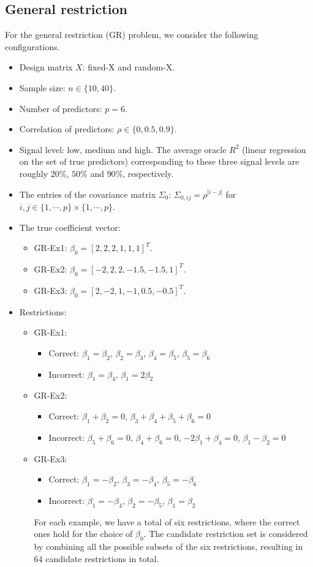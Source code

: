\documentclass{article}
\begin{document}
\subsection{General restriction}
For the general restriction (GR) problem, we consider the following configurations.
\begin{itemize}
  \item Design matrix $X$: fixed-X and random-X.
  \item Sample size: $n \in \{10, 40\}$.
  \item Number of predictors: $p=6$.
  \item Correlation of predictors: $\rho \in \{0,0.5,0.9\}$.
  \item Signal level: low, medium and high. The average oracle $R^2$ (linear regression on the set of true predictors) corresponding to these three signal levels are roughly $20\%$, $50\%$ and $90\%$, respectively.
  \item The entries of the covariance matrix $\Sigma_0$: $\Sigma_{0,ij}=\rho^{|i-j|}$ for $i,j\in\{1,\cdots,p\}\times\{1,\cdots,p\}$.
  \item The true coefficient vector:
  \begin{itemize}
    \item GR-Ex1: $\beta_0 = [2,2,2,1,1,1]^T$. 
    \item GR-Ex2: $\beta_0 = [-2,2,2,-1.5,-1.5,1]^T$.
    \item GR-Ex3: $\beta_0 = [2,-2,1,-1,0.5,-0.5]^T$.
  \end{itemize}
  \item Restrictions:
  \begin{itemize}
    \item GR-Ex1: 
    \begin{itemize}
      \item Correct: $\beta_1=\beta_2$, $\beta_2=\beta_3$, $\beta_4=\beta_5$, $\beta_5=\beta_6$
      \item Incorrect: $\beta_1=\beta_4$, $\beta_1=2\beta_2$
    \end{itemize}
    \item GR-Ex2:
    \begin{itemize}
      \item Correct: $\beta_1+\beta_2=0$, $\beta_3+\beta_4+\beta_5+\beta_6=0$
      \item Incorrect: $\beta_5+\beta_6=0$, $\beta_4+\beta_6=0$, $-2\beta_1+\beta_4=0$, $\beta_1-\beta_2=0$
    \end{itemize}
    \item GR-Ex3: 
    \begin{itemize}
      \item Correct: $\beta_1=-\beta_2$, $\beta_3=-\beta_4$, $\beta_5=-\beta_6$
      \item Incorrect: $\beta_1=-\beta_4$, $\beta_2=-\beta_5$, $\beta_1=\beta_2$
    \end{itemize}
    For each example, we have a total of six restrictions, where the correct ones hold for the choice of $\beta_0$. The candidate restriction set is considered by combining all the possible subsets of the six restrictions, resulting in $64$ candidate restrictions in total.
  \end{itemize}
\end{itemize}
\end{document}

